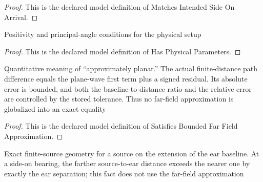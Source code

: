 \begin{proof}
  This is the declared model definition of Matches Intended Side On Arrival.
\end{proof}
\begin{definition}
  \label{def:physics:phyx-mini-0308:phyxminiproblems-problemphyxmini0308-hasphysicalparameters}
  Positivity and principal-angle conditions for the physical setup
\end{definition}
\begin{proof}
  This is the declared model definition of Has Physical Parameters.
\end{proof}
\begin{definition}
  \label{def:physics:phyx-mini-0308:phyxminiproblems-problemphyxmini0308-satisfiesboundedfarfieldapproximation}
  Quantitative meaning of “approximately planar.” The actual finite-distance path difference equals the plane-wave first term plus a signed residual. Its absolute error is bounded, and both the baseline-to-distance ratio and the relative error are controlled by the stored tolerance. Thus no far-field approximation is globalized into an exact equality
\end{definition}
\begin{proof}
  This is the declared model definition of Satisfies Bounded Far Field Approximation.
\end{proof}
\begin{definition}
  \label{def:physics:phyx-mini-0308:phyxminiproblems-problemphyxmini0308-satisfiesexactsideonsourcegeometry}
  Exact finite-source geometry for a source on the extension of the ear baseline. At a side-on bearing, the farther source-to-ear distance exceeds the nearer one by exactly the ear separation; this fact does not use the far-field approximation
\end{definition}

